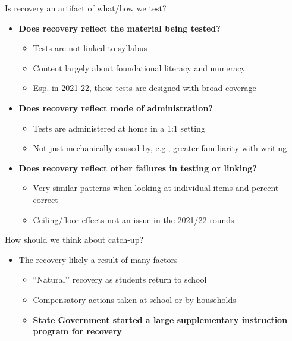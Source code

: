 \documentclass[aspectratio=169,numbering=none]{beamer}
\begin{document}
\begin{frame}[plain]{Is recovery an artifact of what/how we test?}
\begin{itemize}
   \vfill \item \textbf{Does recovery reflect the material being tested?}
    \begin{itemize}
        \item Tests are not linked to syllabus
        \item Content largely about foundational literacy and numeracy
        \item Esp. in 2021-22, these tests are designed with broad coverage
    \end{itemize}
    \vfill \item \textbf{Does recovery reflect mode of administration?}
    \begin{itemize}
        \item Tests are administered at home in a 1:1 setting
        \item Not just mechanically caused by, e.g., greater familiarity with writing 
    \end{itemize}
    \vfill \item \textbf{Does recovery reflect other failures in testing or linking?}
    \begin{itemize}
        \item Very similar patterns when looking at individual items and percent correct
        \item Ceiling/floor effects not an issue in the 2021/22 rounds
    \end{itemize}
\end{itemize}
\end{frame}

\begin{frame}[plain,label=catchup]{How should we think about catch-up?}
\begin{itemize}
\vfill \item The recovery likely a result of many factors
\begin{itemize}
\vfill\item ``Natural’’ recovery as students return to school
\vfill\item  Compensatory actions taken at school or by households
\vfill\item \textbf{State Government started a large supplementary instruction program for recovery}
\end{itemize}
\end{itemize}
\end{frame}
\end{document}
